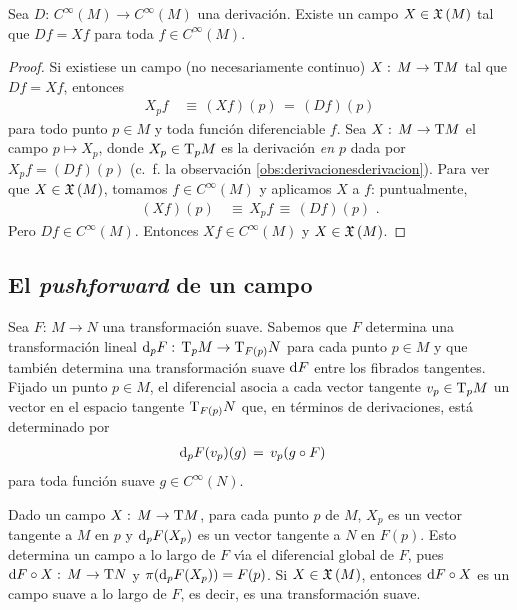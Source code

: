 \begin{teoDerivacionesYCampos}\label{thm:derivacionesycampos}
	Sea $D:\,C^{\infty}(M)\rightarrow C^{\infty}(M)$ una derivaci\'{o}n.
	Existe un campo $X\in\mathfrak{X}\left(M\right)$ tal que $Df=Xf$ para toda
	$f\in C^{\infty}(M)$.
\end{teoDerivacionesYCampos}

\begin{proof}
	Si existiese un campo (no necesariamente continuo)
	$X:\,M\rightarrow\tangente{M}$ tal que $Df=Xf$, entonces
	\begin{align*}
		X_{p}f & \,\equiv\,(Xf)(p) \,=\,(Df)(p)
	\end{align*}
	para todo punto $p\in M$ y toda funci\'{o}n diferenciable $f$.
	Sea $X:\,M\rightarrow\tangente{M}$ el campo $p\mapsto X_{p}$,
	donde $X_{p}\in\tangente[p]{M}$ es la derivaci\'{o}n \emph{en $p$}
	dada por $X_{p}f=(Df)(p)$ (c.~f. la observaci\'{o}n
	\ref{obs:derivacionesderivacion}). Para ver que $X\in\mathfrak{X}\left(M\right)$,
	tomamos $f\in C^{\infty}(M)$ y aplicamos $X$ a $f$: puntualmente,
	\begin{align*}
		(Xf)(p) & \,\equiv\, X_{p}f\,\equiv\,(Df)(p)
		\text{ .}
	\end{align*}
	Pero $Df\in C^{\infty}(M)$. Entonces $Xf\in C^{\infty}(M)$ y
	$X\in\mathfrak{X}\left(M\right)$.
\end{proof}

\subsection{El \emph{pushforward} de un campo}
Sea $F:\,M\rightarrow N$ una transformaci\'{o}n suave. Sabemos que $F$
determina una transformaci\'{o}n lineal $\diferencial[p]{F}:\,%
\tangente[p]{M}\rightarrow\tangente[F(p)]{N}$ para cada punto $p\in M$ y
que tambi\'{e}n determina una transformaci\'{o}n suave $\diferencial{F}$
entre los fibrados tangentes. Fijado un punto $p\in M$, el diferencial
asocia a cada vector tangente $v_{p}\in\tangente[p]{M}$ un vector en
el espacio tangente $\tangente[F(p)]{N}$ que, en t\'{e}rminos de derivaciones,
est\'{a} determinado por
\begin{align*}
	\diferencial[p]{F}(v_{p})(g) & \,=\,v_{p}(g\circ F)
\end{align*}
%
para toda funci\'{o}n suave $g\in C^{\infty}(N)$.

Dado un campo $X:\,M\rightarrow\tangente{M}$, para cada punto $p$ de $M$,
$X_{p}$ es un vector tangente a $M$ en $p$ y $\diferencial[p]{F}(X_{p})$
es un vector tangente a $N$ en $F(p)$. Esto determina un campo a lo largo
de $F$ v\'{\i}a el diferencial global de $F$, pues
$\diferencial{F}\circ X:\,M\rightarrow\tangente{N}$ y
$\pi(\diferencial[p]{F}(X_{p}))=F(p)$. Si $X\in\mathfrak{X}\left(M\right)$, entonces
$\diferencial{F}\circ X$ es un campo suave a lo largo de $F$, es decir, es
una transformaci\'{o}n suave.

